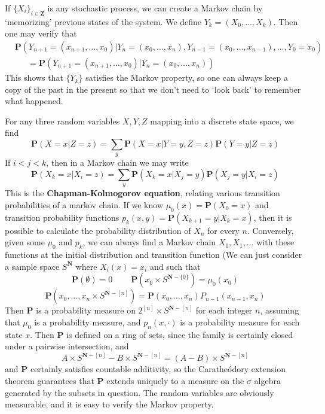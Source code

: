 \begin{example}
    If $\{X_i\}_{i \in \mathbf{Z}}$ is any stochastic process, we can create a Markov chain by `memorizing' previous states of the system. We define $Y_k = (X_0, \dots, X_k)$. Then one may verify that
    \begin{align*} &\mathbf{P}(Y_{n+1} = (x_{n+1}, \dots, x_0) | Y_n = (x_0, \dots, x_n), Y_{n-1} = (x_0, \dots, x_{n-1}), \dots, Y_0 = x_0)\\
    &\ \ \ \ \ \ \ = \mathbf{P}(Y_{n+1} = (x_{n+1}, \dots, x_0) | Y_n = (x_0, \dots, x_n)) \end{align*}
    This shows that $\{ Y_k \}$ satisfies the Markov property, so one can always keep a copy of the past in the present so that we don't need to `look back' to remember what happened.
\end{example}

For any three random variables $X,Y,Z$ mapping into a discrete state space, we find
%
\[ \mathbf{P}(X = x | Z = z) = \sum_y \mathbf{P}(X = x | Y = y, Z = z) \mathbf{P}(Y = y| Z = z) \]
%
If $i < j < k$, then in a Markov chain we may write
%
\[ \mathbf{P}(X_k = x | X_i = z) = \sum_y \mathbf{P}(X_k = x | X_j = y) \mathbf{P}(X_j = y | X_i = z) \]
%
This is the {\bf Chapman-Kolmogorov equation}, relating various transition probabilities of a markov chain. If we know $\mu_0(x) = \mathbf{P}(X_0 = x)$ and transition probability functions $p_k(x,y) = \mathbf{P}(X_{k+1} = y | X_k = x)$, then it is possible to calculate the probability distribution of $X_n$ for every $n$. Conversely, given some $\mu_0$ and $p_k$, we can always find a Markov chain $X_0, X_1, \dots$ with these functions at the initial distribution and transition function (We can just consider a sample space $S^{\mathbf{N}}$ where $X_i(x) = x_i$ and such that
%
\[ \mathbf{P}(\emptyset) = 0\ \ \ \ \ \ \ \ \ \ \mathbf{P}(x_0 \times S^{\mathbf{N} - \{ 0 \}}) = \mu_0(x_0) \]
\[ \mathbf{P}(x_0, \dots, x_n \times S^{\mathbf{N} - [n]}) = \mathbf{P}(x_0, \dots, x_n) P_{n-1}(x_{n-1},x_n) \]
%
Then $\mathbf{P}$ is a probability measure on $2^{[n]} \times S^{\mathbf{N} - [n]}$ for each integer $n$, assuming that $\mu_0$ is a probability measure, and $p_n(x,\cdot)$ is a probability measure for each state $x$. Then $\mathbf{P}$ is defined on a ring of sets, since the family is certainly closed under a pairwise intersection, and
%
\[ A \times S^{\mathbf{N}-[n]} - B \times S^{\mathbf{N}-[n]} = (A - B) \times S^{\mathbf{N}-[n]} \]
%
and $\mathbf{P}$ certainly satisfies countable additivity, so the Carathe\'{o}dory extension theorem guarantees that $\mathbf{P}$ extends uniquely to a measure on the $\sigma$ algebra generated by the subsets in question. The random variables are obviously measurable, and it is easy to verify the Markov property.

